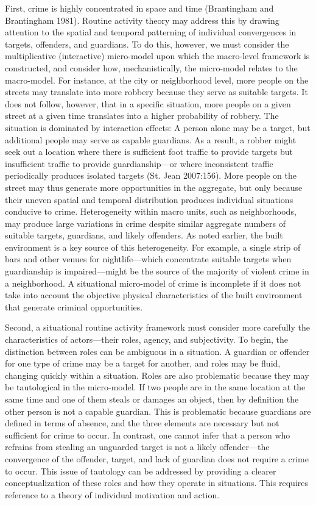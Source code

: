 \documentclass [11pt, proquest] {uwthesis}[2015/03/03]
\begin{document}
First, crime is highly concentrated in space and time (Brantingham and Brantingham 1981). Routine activity theory may address this by drawing attention to the spatial and temporal patterning of individual convergences in targets, offenders, and guardians. To do this, however, we must consider the multiplicative (interactive) micro-model upon which the macro-level framework is constructed, and consider how, mechanistically, the micro-model relates to the macro-model. For instance, at the city or neighborhood level, more people on the streets may translate into more robbery because they serve as suitable targets. It does not follow, however, that in a specific situation, more people on a given street at a given time translates into a higher probability of robbery. The situation is dominated by interaction effects: A person alone may be a target, but additional people may serve as capable guardians. As a result, a robber might seek out a location where there is sufficient foot traffic to provide targets but insufficient traffic to provide guardianship---or where inconsistent traffic periodically produces isolated targets (St. Jean 2007:156). More people on the street may thus generate more opportunities in the aggregate, but only because their uneven spatial and temporal distribution produces individual situations conducive to crime. Heterogeneity within macro units, such as neighborhoods, may produce large variations in crime despite similar aggregate numbers of suitable targets, guardians, and likely offenders. As noted earlier, the built environment is a key source of this heterogeneity. For example, a single strip of bars and other venues for nightlife---which concentrate suitable targets when guardianship is impaired---might be the source of the majority of violent crime in a neighborhood. A situational micro-model of crime is incomplete if it does not take into account the objective physical characteristics of the built environment that generate criminal opportunities.

Second, a situational routine activity framework must consider more carefully the characteristics of actors---their roles, agency, and subjectivity. To begin, the distinction between roles can be ambiguous in a situation. A guardian or offender for one type of crime may be a target for another, and roles may be fluid, changing quickly within a situation. Roles are also problematic because they may be tautological in the micro-model. If two people are in the same location at the same time and one of them steals or damages an object, then by definition the other person is not a capable guardian. This is problematic because guardians are defined in terms of absence, and the three elements are necessary but not sufficient for crime to occur. In contrast, one cannot infer that a person who refrains from stealing an unguarded target is not a likely offender---the convergence of the offender, target, and lack of guardian does not require a crime to occur. This issue of tautology can be addressed by providing a clearer conceptualization of these roles and how they operate in situations. This requires reference to a theory of individual motivation and action.
\end{document}

